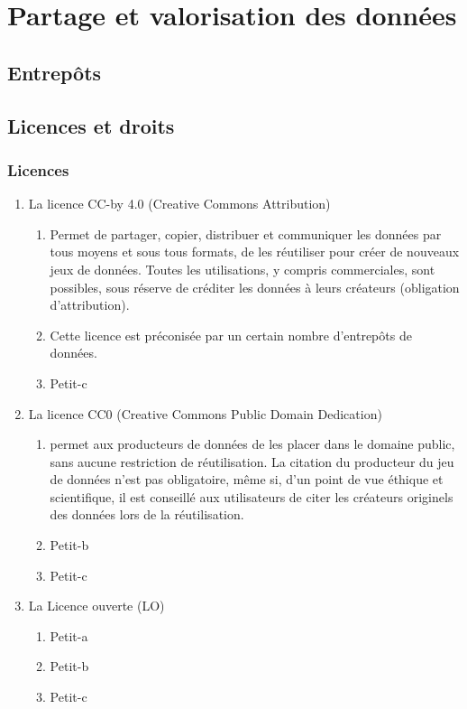 \documentclass{book}
\begin{document}
\chapter{Partage et valorisation des données}


\section{Entrepôts}

	
\section{Licences et droits}

\subsection{Licences}\label{licences}
\begin{enumerate}
	\item La licence CC-by 4.0 (Creative Commons Attribution)\label{cca}
        \begin{enumerate}
            \item Permet de partager, copier, distribuer et communiquer les données par tous moyens et sous tous formats, de les réutiliser pour créer de nouveaux jeux de données. Toutes les utilisations, y compris commerciales, sont possibles, sous réserve de créditer les données à leurs créateurs (obligation d’attribution).
            \item Cette licence est préconisée par un certain nombre d’entrepôts de données.
            \item Petit-c
        \end{enumerate}
	\item La licence CC0 (Creative Commons Public Domain Dedication)\label{cczero}
        \begin{enumerate}
            \item permet aux producteurs de données de les placer dans le domaine public, sans aucune restriction de réutilisation.
            La citation du producteur du jeu de données n’est pas obligatoire, même si, d’un point de vue éthique et scientifique, il est conseillé aux utilisateurs de citer les créateurs originels des données lors de la réutilisation.
            \item Petit-b
            \item Petit-c
        \end{enumerate}
	\item La Licence ouverte (LO)
        \begin{enumerate}
            \item Petit-a
            \item Petit-b
            \item Petit-c
        \end{enumerate}
\end{enumerate}
\end{document}
